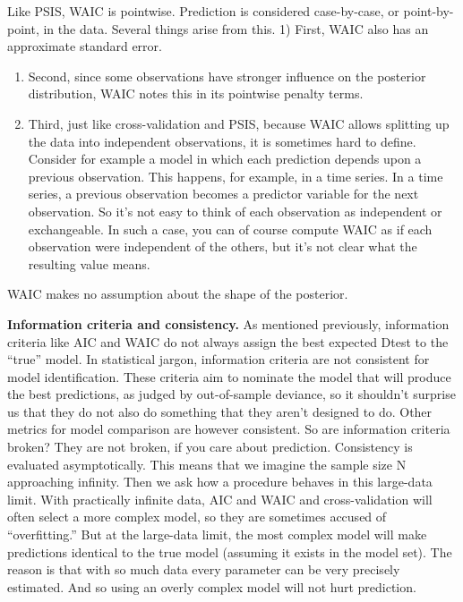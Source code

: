 \documentclass[
]{article}
\begin{document}
Like PSIS, WAIC is pointwise. Prediction is considered case-by-case, or
point-by-point, in the data. Several things arise from this. 1) First,
WAIC also has an approximate standard error.

\begin{enumerate}
\def\labelenumi{\arabic{enumi})}
\setcounter{enumi}{1}
\item
  Second, since some observations have stronger influence on the
  posterior distribution, WAIC notes this in its pointwise penalty
  terms.
\item
  Third, just like cross-validation and PSIS, because WAIC allows
  splitting up the data into independent observations, it is sometimes
  hard to define. Consider for example a model in which each prediction
  depends upon a previous observation. This happens, for example, in a
  time series. In a time series, a previous observation becomes a
  predictor variable for the next observation. So it's not easy to think
  of each observation as independent or exchangeable. In such a case,
  you can of course compute WAIC as if each observation were independent
  of the others, but it's not clear what the resulting value means.
\end{enumerate}

WAIC makes no assumption about the shape of the posterior.

\textbf{Information criteria and consistency.} As mentioned previously,
information criteria like AIC and WAIC do not always assign the best
expected Dtest to the ``true'' model. In statistical jargon, information
criteria are not consistent for model identification. These criteria aim
to nominate the model that will produce the best predictions, as judged
by out-of-sample deviance, so it shouldn't surprise us that they do not
also do something that they aren't designed to do. Other metrics for
model comparison are however consistent. So are information criteria
broken? They are not broken, if you care about prediction. Consistency
is evaluated asymptotically. This means that we imagine the sample size
N approaching infinity. Then we ask how a procedure behaves in this
large-data limit. With practically infinite data, AIC and WAIC and
cross-validation will often select a more complex model, so they are
sometimes accused of ``overfitting.'' But at the large-data limit, the
most complex model will make predictions identical to the true model
(assuming it exists in the model set). The reason is that with so much
data every parameter can be very precisely estimated. And so using an
overly complex model will not hurt prediction.
\end{document}
